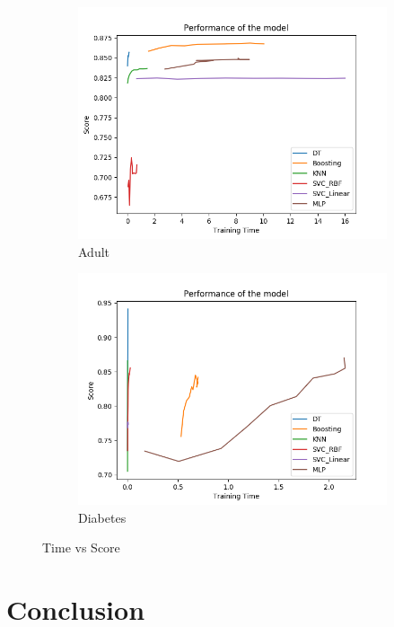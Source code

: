 \documentclass[11pt, twocolumn]{article}
\begin{document}
    \begin{figure}[!htbp]
        \begin{subfigure}{.24\textwidth}
            \centering
            \includegraphics[width=.9\textwidth]{performance_Adult_optimized}
            \caption{Adult}
            \label{fig:performance_Adult_optimized}
        \end{subfigure}
        \begin{subfigure}{.24\textwidth}
            \centering
            \includegraphics[width=.9\textwidth]{performance_Diabetes_optimized}
            \caption{Diabetes}
            \label{fig:performance_Diabetes_optimized}
        \end{subfigure}
        \caption{Time vs Score}
    \end{figure}
    \FloatBarrier

    \section{Conclusion}
\end{document}
